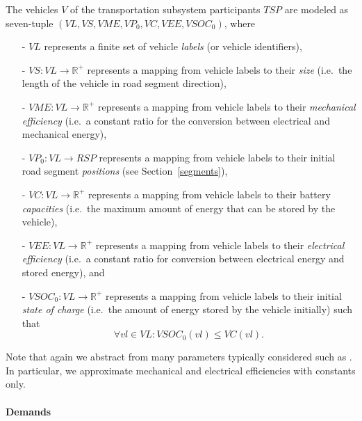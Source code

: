 The vehicles $V$ of the transportation subsystem participants $TSP$ are modeled as seven-tuple $(VL, VS, VME, VP_0, VC, VEE, VSOC_0)$, where
\begin{itemize}
	\item[-] $VL$ represents a finite set of vehicle \textit{labels} (or vehicle identifiers),
	\item[-] $VS: VL \rightarrow \mathbb{R}^+$ represents a mapping from vehicle labels to their \textit{size} (i.e.\ the length of the vehicle in road segment direction),
	\item[-] $VME: VL \rightarrow \mathbb{R}^+$ represents a mapping from vehicle labels to their \textit{mechanical efficiency} (i.e.\ a constant ratio for the conversion between electrical and mechanical energy),
	\item[-] $VP_0: VL \rightarrow RSP$ represents a mapping from vehicle labels to their initial road segment \textit{positions} (see Section~\ref{segments}),
	\item[-] $VC: VL \rightarrow \mathbb{R}^+$ represents a mapping from vehicle labels to their battery \textit{capacities} (i.e.\ the maximum amount of energy that can be stored by the vehicle),
	\item[-] $VEE: VL \rightarrow \mathbb{R}^+$ represents a mapping from vehicle labels to their \textit{electrical efficiency} (i.e.\ a constant ratio for conversion between electrical energy and stored energy), and
	\item[-] $VSOC_0: VL \rightarrow \mathbb{R}^+$ represents a mapping from vehicle labels to their initial \textit{state of charge} (i.e.\ the amount of energy stored by the vehicle initially) such that
	\[
		\forall vl \in VL : VSOC_0(vl) \leq VC(vl) \textrm{.}
	\]
\end{itemize}
Note that again we abstract from many parameters typically considered such as . In particular, we approximate mechanical and electrical efficiencies with constants only.


\paragraph{Demands}
\label{demands}

